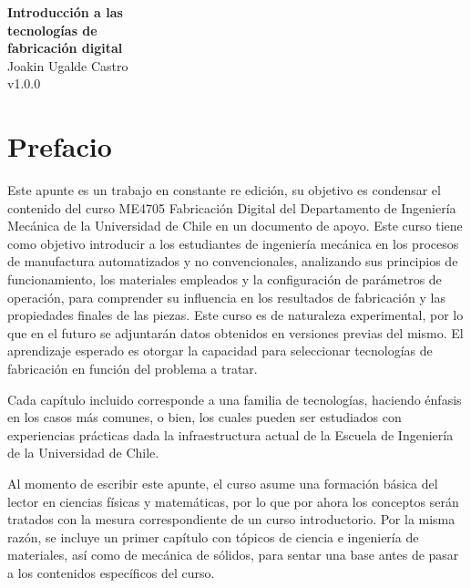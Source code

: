 \documentclass[12pt,letter,oneside]{book}
\numberwithin{equation}{chapter}
\numberwithin{figure}{chapter}
\numberwithin{table}{chapter}
\begin{document}
\begin{titlepage}
    \centering
     \vspace*{\fill}
    {\Huge \textbf{Introducción a las \\ tecnologías de \vspace{0.4cm}\\ fabricación digital}}\\[0.5cm]
    {\large Joakin Ugalde Castro}\\
    {\large v1.0.0}\\[4cm]
    \vfill
\end{titlepage}

\tableofcontents

\chapter*{Prefacio}

Este apunte es un trabajo en constante re edición, su objetivo es condensar el contenido del curso ME4705 Fabricación Digital del Departamento de Ingeniería Mecánica de la Universidad de Chile en un documento de apoyo. Este curso tiene como objetivo introducir a los estudiantes de ingeniería mecánica en los procesos de manufactura automatizados y no convencionales, analizando sus principios de funcionamiento, los materiales empleados y la configuración de parámetros de operación, para comprender su influencia en los resultados de fabricación y las propiedades finales de las piezas. Este curso es de naturaleza experimental, por lo que en el futuro se adjuntarán datos obtenidos en versiones previas del mismo. El aprendizaje esperado es otorgar la capacidad para seleccionar tecnologías de fabricación en función del problema a tratar.

Cada capítulo incluido corresponde a una familia de tecnologías, haciendo énfasis en los casos más comunes, o bien, los cuales pueden ser estudiados con experiencias prácticas dada la infraestructura actual de la Escuela de Ingeniería de la Universidad de Chile.

Al momento de escribir este apunte, el curso asume una formación básica del lector en ciencias físicas y matemáticas, por lo que por ahora los conceptos serán tratados con la mesura correspondiente de un curso introductorio. Por la misma razón, se incluye un primer capítulo con tópicos de ciencia e ingeniería de materiales, así como de mecánica de sólidos, para sentar una base antes de pasar a los contenidos específicos del curso.
\end{document}

